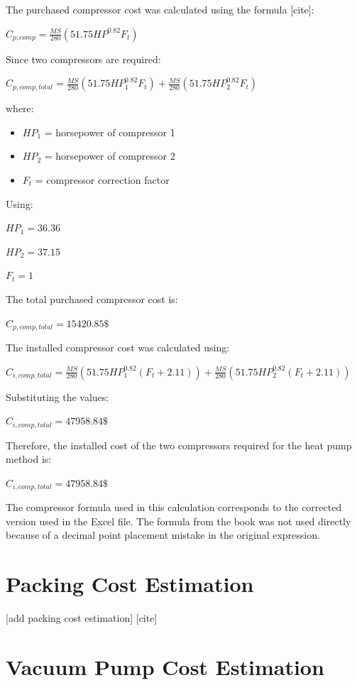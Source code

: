 The purchased compressor cost was calculated using the formula
{[}cite{]}:

\(C_{p,comp} = \frac{MS}{280} \left(51.75 HP^{0.82} F_t \right)\)

Since two compressors are required:

\(C_{p,comp,total} = \frac{MS}{280} \left(51.75 HP_1^{0.82} F_t \right) + \frac{MS}{280} \left(51.75 HP_2^{0.82} F_t \right)\)

where:

\begin{itemize}
\tightlist
\item
  \(HP_1\) = horsepower of compressor 1
\item
  \(HP_2\) = horsepower of compressor 2
\item
  \(F_t\) = compressor correction factor
\end{itemize}

Using:

\(HP_1 = 36.36\)

\(HP_2 = 37.15\)

\(F_t = 1\)

The total purchased compressor cost is:

\(C_{p,comp,total} = 15420.85 \text{\$}\)

The installed compressor cost was calculated using:

\(C_{i,comp,total} = \frac{MS}{280} \left(51.75 HP_1^{0.82}(F_t + 2.11)\right) + \frac{MS}{280} \left(51.75 HP_2^{0.82}(F_t + 2.11)\right)\)

Substituting the values:

\(C_{i,comp,total} = 47958.84 \text{\$}\)

Therefore, the installed cost of the two compressors required for the
heat pump method is:

\(C_{i,comp,total} = 47958.84 \text{\$}\)

The compressor formula used in this calculation corresponds to the
corrected version used in the Excel file. The formula from the book was
not used directly because of a decimal point placement mistake in the
original expression.

\section{Packing Cost Estimation}\label{packing-cost-estimation}

{[}add packing cost estimation{]} {[}cite{]}

\section{Vacuum Pump Cost Estimation}\label{vacuum-pump-cost-estimation}

